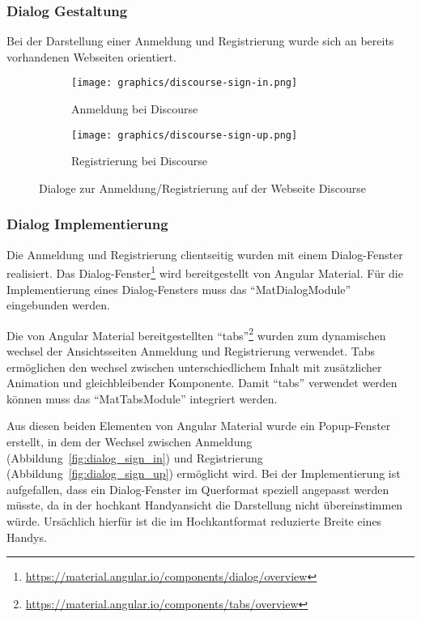 \subsubsection{Dialog Gestaltung}
Bei der Darstellung einer Anmeldung und Registrierung wurde sich an bereits vorhandenen Webseiten orientiert.

\begin{figure}[h]
	\centering
	\begin{subfigure}{.5\textwidth}
		\texttt{[image: graphics/discourse-sign-in.png]}
		\caption{Anmeldung bei Discourse}
		\label{fig:discourse-sign-in}
	\end{subfigure}%
	\begin{subfigure}{.5\textwidth}
		\centering
		\texttt{[image: graphics/discourse-sign-up.png]}
		\caption{Registrierung bei Discourse}
		\label{fig:discourse-sign-up}
	\end{subfigure}
	\caption{Dialoge zur Anmeldung/Registrierung auf der Webseite Discourse}
	\label{fig:discourse}
\end{figure}

\subsubsection{Dialog Implementierung}
\label{sec:client-dialog-authentication}
Die Anmeldung und Registrierung clientseitig wurden mit einem Dialog-Fenster realisiert. Das Dialog-Fenster\footnote{\url{https://material.angular.io/components/dialog/overview}} wird bereitgestellt von Angular Material. Für die Implementierung eines Dialog-Fensters muss das \enquote{MatDialogModule} eingebunden werden.

Die von Angular Material bereitgestellten \enquote{tabs}\footnote{\url{https://material.angular.io/components/tabs/overview}} wurden zum dynamischen wechsel der Ansichtsseiten Anmeldung und Registrierung verwendet. Tabs ermöglichen den wechsel zwischen unterschiedlichem Inhalt mit zusätzlicher Animation und gleichbleibender Komponente. Damit \enquote{tabs} verwendet werden können muss das \enquote{MatTabsModule} integriert werden.

Aus diesen beiden Elementen von Angular Material wurde ein Popup-Fenster erstellt, in dem der Wechsel zwischen Anmeldung (Abbildung~\ref{fig:dialog_sign_in}) und Registrierung (Abbildung~\ref{fig:dialog_sign_up}) ermöglicht wird. Bei der Implementierung ist aufgefallen, dass ein Dialog-Fenster im Querformat speziell angepasst werden müsste, da in der hochkant Handyansicht die Darstellung nicht übereinstimmen würde. Ursächlich hierfür ist die im Hochkantformat reduzierte Breite eines Handys.

